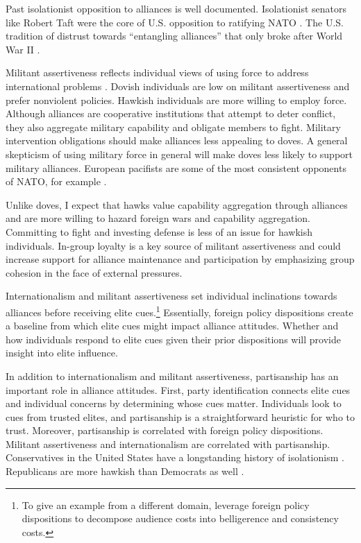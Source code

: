 \documentclass[12pt]{article}
\begin{document}
Past isolationist opposition to alliances is well documented. 
Isolationist senators like Robert Taft were the core of U.S. opposition to ratifying NATO \citep{Kaplan2007}.
The U.S. tradition of distrust towards ``entangling alliances'' that only broke after World War II \citep{Kupchan2020}.


Militant assertiveness reflects individual views of using force to address international problems \citep{Herrmannetal1999}. 
Dovish individuals are low on militant assertiveness and prefer nonviolent policies.
Hawkish individuals are more willing to employ force.
Although alliances are cooperative institutions that attempt to deter conflict, they also aggregate military capability and obligate members to fight.
Military intervention obligations should make alliances less appealing to doves.
A general skepticism of using military force in general will make doves less likely to support military alliances.  
European pacifists are some of the most consistent opponents of NATO, for example \citep{Thies2015}.


Unlike doves, I expect that hawks value capability aggregation through alliances and are more willing to hazard foreign wars and capability aggregation. 
Committing to fight and investing defense is less of an issue for hawkish individuals. 
In-group loyalty is a key source of militant assertiveness \citep{Kertzeretal2014} and could increase support for alliance maintenance and participation by emphasizing group cohesion in the face of external pressures.


Internationalism and militant assertiveness set individual inclinations towards alliances before receiving elite cues.\footnote{To give an example from a different domain, \citet{KertzerBrutger2016} leverage foreign policy dispositions to decompose audience costs into belligerence and consistency costs.}
Essentially, foreign policy dispositions create a baseline from which elite cues might impact alliance attitudes. 
Whether and how individuals respond to elite cues given their prior dispositions will provide insight into elite influence. 


In addition to internationalism and militant assertiveness, partisanship has an important role in alliance attitudes. 
First, party identification connects elite cues and individual concerns by determining whose cues matter.
Individuals look to cues from trusted elites, and partisanship is a straightforward heuristic for who to trust. 
Moreover, partisanship is correlated with foreign policy dispositions. 
Militant assertiveness and internationalism are correlated with partisanship. 
Conservatives in the United States have a longstanding history of isolationism \citep{Kupchan2020}.
Republicans are more hawkish than Democrats as well \citep{Gries2014}. 
\end{document}
